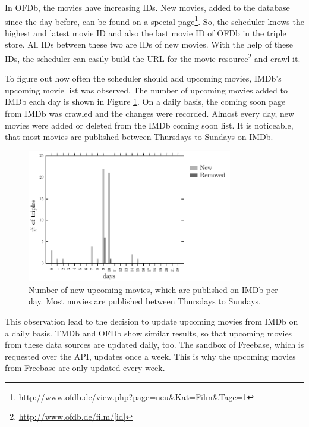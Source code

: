 In OFDb, the movies have increasing IDs.
New movies, added to the database since the day before, can be found on a special page\footnote{\url{http://www.ofdb.de/view.php?page=neu&Kat=Film&Tage=1}}.
So, the scheduler knows the highest and latest movie ID and also the last movie ID of OFDb in the triple store.
All IDs between these two are IDs of new movies.
With the help of these IDs, the scheduler can easily build the URL for the movie resource\footnote{\url{http://www.ofdb.de/film/[id]}} and crawl it.

To figure out how often the scheduler should add upcoming movies, IMDb's upcoming movie list was observed.
The number of upcoming movies added to IMDb each day is shown in Figure \ref{fig_coming_soon_movie}.
On a daily basis, the coming soon page from IMDb was crawled and the changes were recorded.
Almost every day, new movies were added or deleted from the IMDb coming soon list.
It is noticeable, that most movies are published between Thursdays to Sundays on IMDb.

\begin{figure}[h!]
  \begin{center}
  \includegraphics[width=0.8\textwidth]{images/updating_1.pdf}
  \end{center}
  \caption{Number of new upcoming movies, which are published on IMDb per day. Most movies are published between Thursdays to Sundays.}
  \label{fig_coming_soon_movie}
\end{figure}

This observation lead to the decision to update upcoming movies from IMDb on a daily basis.
TMDb and OFDb show similar results, so that upcoming movies from these data sources are updated daily, too.
The sandbox of Freebase, which is requested over the API, updates once a week.
This is why the upcoming movies from Freebase are only updated every week.

